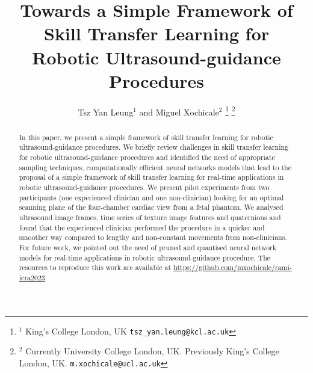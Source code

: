 \documentclass[a4paper, 10pt, conference]{ieeeconf}      %
\title{\LARGE \bf
Towards a Simple Framework of Skill Transfer Learning for \\ Robotic Ultrasound-guidance Procedures %
}
\author{Tsz Yan Leung$^{1}$ and Miguel Xochicale$^{2}$%
\thanks{$^{1}$
	King's College London, UK
       {\tt\small tsz\_yan.leung@kcl.ac.uk}}%
\thanks{$^{2}$
	Currently University College London, UK. 
        Previously King's College London, UK.
        {\tt\small m.xochicale@ucl.ac.uk}}%
}
\begin{document}
\maketitle
\thispagestyle{empty}
\pagestyle{empty}


\begin{abstract}
In this paper, we present a simple framework of skill transfer learning for robotic ultrasound-guidance procedures.
We briefly review challenges in skill transfer learning for robotic ultrasound-guidance procedures and identified the need of appropriate sampling techniques, computationally efficient neural networks models that lead to the proposal of a simple framework of skill transfer learning for real-time applications in robotic ultrasound-guidance procedures.
We present pilot experiments from two participants (one experienced clinician and one non-clinician) looking for an optimal scanning plane of the four-chamber cardiac view from a fetal phantom.
We analysed ultrasound image frames, time series of texture image features and quaternions and found that the experienced clinician performed the procedure in a quicker and smoother way compared to lengthy and non-constant movements from non-clinicians.
For future work, we pointed out
the need of pruned and quantised neural network models
for real-time applications in robotic ultrasound-guidance
procedure.
The resources to reproduce this work are available at \url{https://github.com/mxochicale/rami-icra2023}.
\end{abstract}



\end{document}
